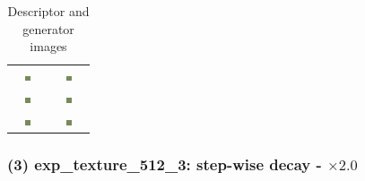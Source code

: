 \documentclass[letter]{article}
\begin{document}
\begin{table}[h!]
\begin{tabular}{cc}
		\includegraphics[width=0.17\textwidth]{../output/ims_syn/ivy2/512_2/syn_im10} & \includegraphics[width=0.17\textwidth]{../output/ims_gen/ivy2/512_2/gen_im10} \tabularnewline
		\includegraphics[width=0.17\textwidth]{../output/ims_syn/ivy2/512_2/syn_im11} & \includegraphics[width=0.17\textwidth]{../output/ims_gen/ivy2/512_2/gen_im11} \tabularnewline
		\includegraphics[width=0.17\textwidth]{../output/ims_syn/ivy2/512_2/syn_im12} & \includegraphics[width=0.17\textwidth]{../output/ims_gen/ivy2/512_2/gen_im12} \tabularnewline
	\end{tabular}
	\caption{Descriptor and generator images}
\end{table}

\newpage

\subsubsection*{(3) exp\_texture\_512\_3: step-wise decay - $\times2.0$}
\end{document}
